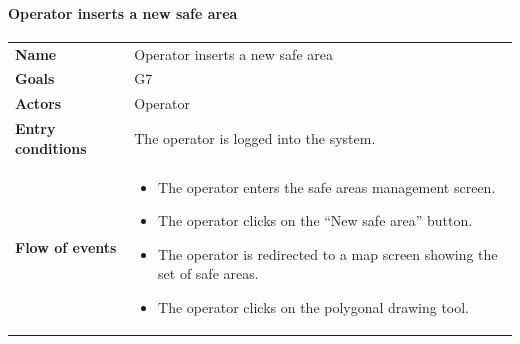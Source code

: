 \documentclass[]{article}
\providecommand{\tightlist}{%
  \setlength{\itemsep}{0pt}\setlength{\parskip}{0pt}}
\let\oldparagraph\paragraph
\renewcommand{\paragraph}[1]{\oldparagraph{#1}\mbox{}}
\begin{document}
\paragraph{Operator inserts a new safe
area}\label{operator-inserts-a-new-safe-area}

\begin{longtable}[]{@{}ll@{}}
\toprule
\begin{minipage}[t]{0.29\columnwidth}\raggedright\strut
\textbf{Name}\strut
\end{minipage} & \begin{minipage}[t]{0.65\columnwidth}\raggedright\strut
Operator inserts a new safe area\strut
\end{minipage}\tabularnewline
\begin{minipage}[t]{0.29\columnwidth}\raggedright\strut
\textbf{Goals}\strut
\end{minipage} & \begin{minipage}[t]{0.65\columnwidth}\raggedright\strut
G7\strut
\end{minipage}\tabularnewline
\begin{minipage}[t]{0.29\columnwidth}\raggedright\strut
\textbf{Actors}\strut
\end{minipage} & \begin{minipage}[t]{0.65\columnwidth}\raggedright\strut
Operator\strut
\end{minipage}\tabularnewline
\begin{minipage}[t]{0.29\columnwidth}\raggedright\strut
\textbf{Entry conditions}\strut
\end{minipage} & \begin{minipage}[t]{0.65\columnwidth}\raggedright\strut
The operator is logged into the system.\strut
\end{minipage}\tabularnewline
\begin{minipage}[t]{0.29\columnwidth}\raggedright\strut
\textbf{Flow of events}\strut
\end{minipage} & \begin{minipage}[t]{0.65\columnwidth}\raggedright\strut
\begin{itemize}
\tightlist
\item
  The operator enters the safe areas management screen.
\item
  The operator clicks on the ``New safe area'' button.
\item
  The operator is redirected to a map screen showing the set of safe
  areas.
\item
  The operator clicks on the polygonal drawing tool.

\end{itemize}
\end{minipage}
\end{longtable}
\end{document}
